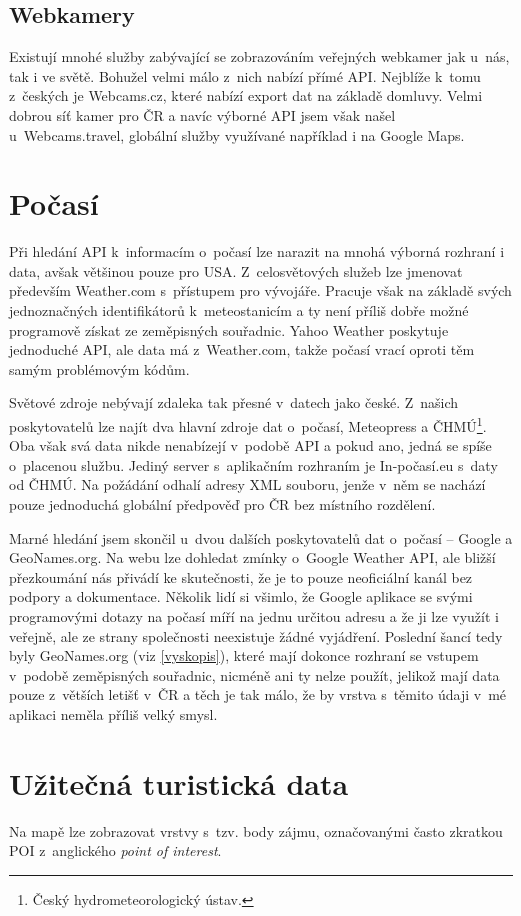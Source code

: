 \subsection{Webkamery}
Existují mnohé služby zabývající se zobrazováním
veřejných webkamer jak u~nás, tak i ve světě. Bohužel velmi málo
z~nich nabízí přímé API. Nejblíže k~tomu z~českých je Webcams.cz,
které nabízí export dat na základě domluvy. Velmi dobrou
síť kamer pro ČR a navíc výborné API jsem však našel
u~Webcams.travel, globální služby využívané například i na Google
Maps.

\section{Počasí}
Při hledání API k~informacím o~počasí lze narazit na mnohá výborná
rozhraní i data, avšak většinou pouze pro USA. Z~celosvětových služeb
lze jmenovat především Weather.com s~přístupem pro vývojáře. Pracuje
však na základě svých jednoznačných identifikátorů k~meteostanicím a
ty není příliš dobře možné programově získat ze zeměpisných
souřadnic. Yahoo Weather poskytuje jednoduché API, ale data má
z~Weather.com, takže počasí vrací oproti těm samým problémovým kódům.

Světové zdroje nebývají zdaleka tak přesné v~datech jako české.
Z~našich poskytovatelů lze najít dva hlavní zdroje dat o~počasí,
Meteopress a ČHMÚ\footnote{Český hydrometeorologický ústav.}. Oba
však svá data nikde nenabízejí v~podobě API a pokud ano, jedná se
spíše o~placenou službu. Jediný server s~aplikačním rozhraním je
In-počasí.eu s~daty od ČHMÚ. Na požádání odhalí adresy XML souboru,
jenže v~něm se nachází pouze jednoduchá globální předpověď pro ČR bez
místního rozdělení.

Marné hledání jsem skončil u~dvou dalších poskytovatelů dat
o~počasí -- Google a GeoNames.org. Na webu lze dohledat zmínky o~Google
Weather API, ale bližší přezkoumání nás přivádí ke skutečnosti, že je
to pouze neoficiální kanál bez podpory a dokumentace. Několik lidí si
všimlo, že Google aplikace se svými programovými dotazy na počasí
míří na jednu určitou adresu a že ji lze využít i veřejně, ale ze
strany společnosti neexistuje žádné vyjádření. Poslední šancí tedy
byly GeoNames.org (viz \ref{vyskopis}), které mají dokonce rozhraní se
vstupem v~podobě zeměpisných souřadnic, nicméně ani ty nelze použít, jelikož mají data
pouze z~větších letišť v~ČR a těch je tak málo, že by vrstva
s~těmito údaji v~mé aplikaci neměla příliš velký smysl. 

\section{Užitečná turistická data}\label{poi}
Na mapě lze zobrazovat vrstvy s~tzv. body zájmu, označovanými často
zkratkou POI z~anglického {\it point of interest}.

